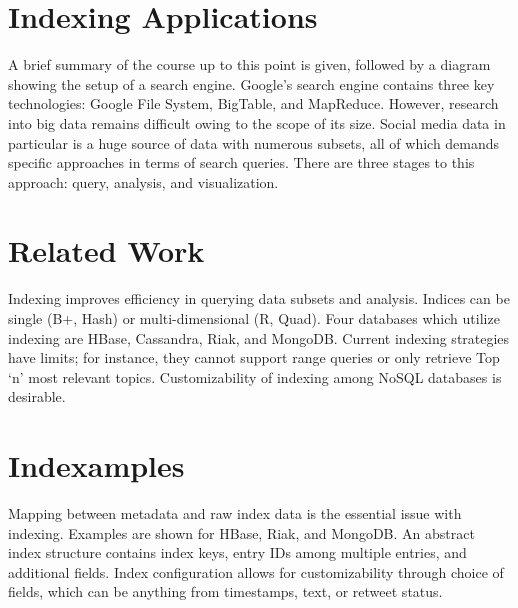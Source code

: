 \section{Indexing Applications}

A brief summary of the course up to this point is given, followed by a
diagram showing the setup of a search engine. Google's search engine
contains three key technologies: Google File System, BigTable, and
MapReduce. However, research into big data remains difficult owing to
the scope of its size. Social media data in particular is a huge source
of data with numerous subsets, all of which demands specific approaches
in terms of search queries. There are three stages to this approach:
query, analysis, and visualization.




\section{Related Work}

Indexing improves efficiency in querying data subsets and analysis.
Indices can be single (B+, Hash) or multi-dimensional (R, Quad). Four
databases which utilize indexing are HBase, Cassandra, Riak, and
MongoDB. Current indexing strategies have limits; for instance, they
cannot support range queries or only retrieve Top `n' most relevant
topics. Customizability of indexing among NoSQL databases is desirable.




\section{Indexamples}

Mapping between metadata and raw index data is the essential issue with
indexing. Examples are shown for HBase, Riak, and MongoDB. An abstract
index structure contains index keys, entry IDs among multiple entries,
and additional fields. Index configuration allows for customizability
through choice of fields, which can be anything from timestamps, text,
or retweet status.

